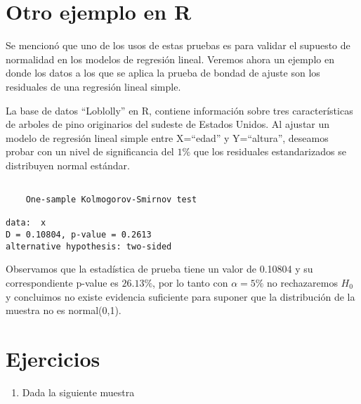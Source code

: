 \documentclass[a4paper,oneside,openany]{book}
\newenvironment{Shaded}{\begin{snugshade}}{\end{snugshade}}
\newcommand{\KeywordTok}[1]{\textcolor[rgb]{0.13,0.29,0.53}{\textbf{#1}}}
\newcommand{\DecValTok}[1]{\textcolor[rgb]{0.00,0.00,0.81}{#1}}
\newcommand{\StringTok}[1]{\textcolor[rgb]{0.31,0.60,0.02}{#1}}
\newcommand{\OperatorTok}[1]{\textcolor[rgb]{0.81,0.36,0.00}{\textbf{#1}}}
\newcommand{\NormalTok}[1]{#1}
\providecommand{\tightlist}{%
  \setlength{\itemsep}{0pt}\setlength{\parskip}{0pt}}
\begin{document}
\section{Otro ejemplo en R}\label{otro-ejemplo-en-r}

Se mencionó que uno de los usos de estas pruebas es para validar el
supuesto de normalidad en los modelos de regresión lineal. Veremos ahora
un ejemplo en donde los datos a los que se aplica la prueba de bondad de
ajuste son los residuales de una regresión lineal simple.

La base de datos ``Loblolly'' en R, contiene información sobre tres
características de arboles de pino originarios del sudeste de Estados
Unidos. Al ajustar un modelo de regresión lineal simple entre X=``edad''
y Y=``altura'', deseamos probar con un nivel de significancia del
\(1\%\) que los residuales estandarizados se distribuyen normal
estándar.

\begin{Shaded}
\end{Shaded}

\begin{verbatim}

    One-sample Kolmogorov-Smirnov test

data:  x
D = 0.10804, p-value = 0.2613
alternative hypothesis: two-sided
\end{verbatim}

Observamos que la estadística de prueba tiene un valor de 0.10804 y su
correspondiente p-value es \(26.13\%\), por lo tanto con \(\alpha=5\%\)
no rechazaremos \(H_0\) y concluimos no existe evidencia suficiente para
suponer que la distribución de la muestra no es normal(0,1).

\section{Ejercicios}\label{ejercicios-14}

\begin{enumerate}
\def\labelenumi{\arabic{enumi}.}
\tightlist
\item
  Dada la siguiente muestra
\end{enumerate}
\end{document}
